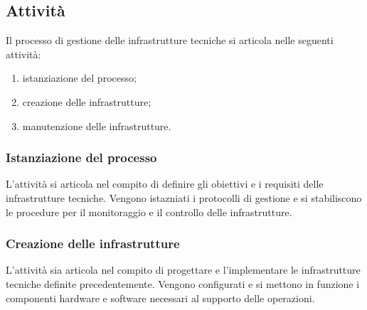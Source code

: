 \subsection{Attività}
Il processo di gestione delle infrastrutture tecniche si articola nelle seguenti attività:
\begin{enumerate}
    \item istanziazione del processo;
    \item creazione delle infrastrutture;
    \item manutenzione delle infrastrutture.
\end{enumerate}
\subsubsection{Istanziazione del processo}
L'attività si articola nel compito di definire gli obiettivi e i requisiti delle infrastrutture tecniche. Vengono istazniati i protocolli di gestione e si stabiliscono le procedure per il monitoraggio e il controllo delle infrastrutture.

\subsubsection{Creazione delle infrastrutture}
L'attività sia articola nel compito di progettare e l'implementare le infrastrutture tecniche definite precedentemente. Vengono configurati e si mettono in funzione i componenti hardware e software necessari al supporto delle operazioni.

